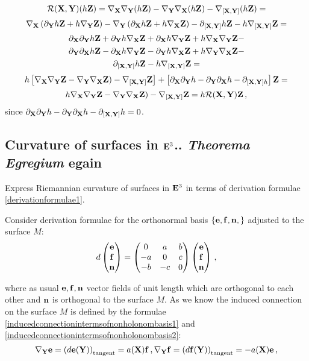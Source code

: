 \documentclass[12pt]{article}
\theoremstyle{theorem}
\numberwithin{equation}{section}
\begin{document}
        $$
         {\cal R}({\bf X},{\bf Y})(h{\bf Z})=
    \nabla_{{\bf X}}\nabla_{\bf Y}(h{\bf Z})-\nabla_{{\bf Y}}\nabla_{\bf X}(h{\bf Z})-
   \nabla_{[{\bf X},{\bf Y}]}(h{\bf Z})=
        $$
        $$
     \nabla_{\bf X}\left(\partial_{\bf Y} h{\bf Z}+h\nabla_{\bf Y}{\bf Z}\right)-\nabla_{\bf Y}\left(\partial_{\bf X} h{\bf Z}+h\nabla_{\bf X}{\bf Z}\right)-
     \partial_{[{\bf X},{\bf Y}]}h {\bf Z}-h\nabla_{[{\bf X},{\bf Y}]}{\bf Z}=
        $$
        $$
    \partial_{\bf X}\partial_{\bf Y} h{\bf Z}+\partial_{\bf Y} h\nabla_{\bf X}{\bf Z}+
    \partial_{\bf X} h\nabla_{\bf Y}{\bf Z}+
    h\nabla_{\bf X}\nabla_{\bf Y} {\bf Z}-
        $$
        $$
        \partial_{\bf Y}\partial_{\bf X} h{\bf Z}-\partial_{\bf X} h\nabla_{\bf Y}{\bf Z}-
    \partial_{\bf Y} h\nabla_{\bf X}{\bf Z}+
    h\nabla_{\bf Y}\nabla_{\bf X} {\bf Z}-
        $$
        $$
      \partial_{[{\bf X},{\bf Y}]}h {\bf Z}-h\nabla_{[{\bf X},{\bf Y}]}{\bf Z}=
        $$
        $$
    h\left[\nabla_{{\bf X}}\nabla_{\bf Y}{\bf Z}-\nabla_{{\bf Y}}\nabla_{\bf X}{\bf Z})-
   \nabla_{[{\bf X},{\bf Y}]}{\bf Z}\right]+\left[\partial_{\bf X}\partial_{\bf Y} h-\partial_{\bf Y}\partial_{\bf X} h-\partial_{[{\bf X},{\bf Y}]h}\right]{\bf Z}=
        $$
        $$
h\nabla_{{\bf X}}\nabla_{\bf Y}{\bf Z}-\nabla_{{\bf Y}}\nabla_{\bf X}{\bf Z})-
   \nabla_{[{\bf X},{\bf Y}]}{\bf Z}=h{\cal R}({\bf X},{\bf Y}){\bf Z}\,,
        $$
   since $\partial_{\bf X}\partial_{\bf Y} h-\partial_{\bf Y}\partial_{\bf X} h-\partial_{[{\bf X},{\bf Y}]}h=0$.




\subsection {Curvature of surfaces in ${\bf E}^3$.. {\it Theorema Egregium} egain}

  Express Riemannian curvature of surfaces in ${\bf E}^3$ in terms of derivation formulae \eqref{derivationformulae1}.

   Consider derivation formulae for the orthonormal basis $\{{\bf e},{\bf f},{\bf n},\}$ adjusted to the surface $M$:
                      \begin{equation}\label{derivationformulae1}
                    d\begin{pmatrix}
                    {\bf e}\cr{\bf f}\cr{\bf n}\cr
                    \end{pmatrix}=
                    \begin{pmatrix}
                    0&a&b\cr -a&0&c\cr -b&-c&0\cr
                    \end{pmatrix}
                 \begin{pmatrix}
                    {\bf e}\cr{\bf f}\cr{\bf n}\cr
                    \end{pmatrix}\,,
                       \end{equation}

where as usual ${\bf e},{\bf f},{\bf n}$ vector fields of unit length which are  orthogonal
to each other and ${\bf n}$ is orthogonal to the surface $M$.  As we know the induced
connection on the surface $M$ is defined by the formulae \eqref{inducedconnectionintermsofnonholonombasis1}
and \eqref{inducedconnectionintermsofnonholonombasis2}:
   \begin{equation}\label{inducedconnectionintermsofnonholonombasis11}
        \nabla_{\bf Y} {\bf e}=\left(d{\bf e}({\bf Y})\right)_{\rm tangent}=a({\bf X}){\bf f}\,,
        \nabla_{\bf Y} {\bf f}=\left(d{\bf f}({\bf Y})\right)_{\rm tangent}=-a({\bf X}){\bf e}\,,
        \end{equation}
\end{document}
